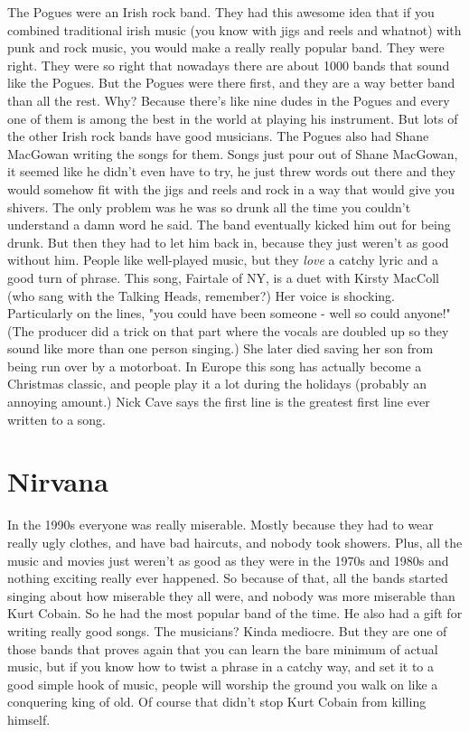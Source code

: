 \documentclass[letterpaper,12pt,single]{article}
\begin{document}
The Pogues were an Irish rock band. They had this awesome idea that if you combined traditional irish music (you know with jigs and reels and whatnot) with punk and rock music, you would make a really really popular band. They were right. They were so right that nowadays there are about 1000 bands that sound like the Pogues. But the Pogues were there first, and they are a way better band than all the rest. Why? Because there's like nine dudes in the Pogues and every one of them is among the best in the world at playing his instrument. But lots of the other Irish rock bands have good musicians. The Pogues also had Shane MacGowan writing the songs for them. Songs just pour out of Shane MacGowan, it seemed like he didn't even have to try, he just threw words out there and they would somehow fit with the jigs and reels and rock in a way that would give you shivers. The only problem was he was so drunk all the time you couldn't understand a damn word he said. The band eventually kicked him out for being drunk. But then they had to let him back in, because they just weren't as good without him. People like well-played music, but they \emph{love} a catchy lyric and a good turn of phrase. This song, Fairtale of NY, is a duet with Kirsty MacColl (who sang with the Talking Heads, remember?) Her voice is shocking. Particularly on the lines, "you could have been someone - well so could anyone!" (The producer did a trick on that part where the vocals are doubled up so they sound like more than one person singing.) She later died saving her son from being run over by a motorboat. In Europe this song has actually become a Christmas classic, and people play it a lot during the holidays (probably an annoying amount.) Nick Cave says the first line is the greatest first line ever written to a song.

\section{Nirvana}

In the 1990s everyone was really miserable. Mostly because they had to wear really ugly clothes, and have bad haircuts, and nobody took showers. Plus, all the music and movies just weren't as good as they were in the 1970s and 1980s and nothing exciting really ever happened. So because of that, all the bands started singing about how miserable they all were, and nobody was more miserable than Kurt Cobain. So he had the most popular band of the time. He also had a gift for writing really good songs. The musicians? Kinda mediocre. But they are one of those bands that proves again that you can learn the bare minimum of actual music, but if you know how to twist a phrase in a catchy way, and set it to a good simple hook of music, people will worship the ground you walk on like a conquering king of old. Of course that didn't stop Kurt Cobain from killing himself.
\end{document}
